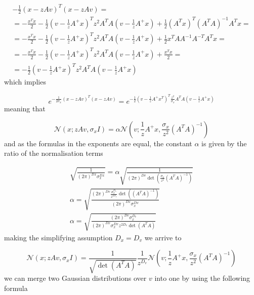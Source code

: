 \documentclass{paper}
\begin{document}
\begin{equation}
\begin{split}
-\frac{1}{2} (x-zAv)^T(x-zAv) = \\
= -\frac{x^Tx}{2} -\frac{1}{2} (v - \frac{1}{z}A^{+}x)^T z^2A^TA (v - \frac{1}{z}A^{+}x)  + \frac{1}{2} (A^Tx)^T (A^TA)^{-1}A^Tx = \\
=-\frac{x^Tx}{2} -\frac{1}{2} (v - \frac{1}{z}A^{+}x)^T z^2A^TA (v - \frac{1}{z}A^{+}x)  + \frac{1}{2} x^T A A^{-1} A^{-T} A^T x = \\
= -\frac{x^Tx}{2} -\frac{1}{2} (v - \frac{1}{z}A^{+}x)^T z^2A^TA (v - \frac{1}{z}A^{+}x)  + \frac{x^Tx}{2} = \\
= -\frac{1}{2} (v - \frac{1}{z}A^{+}x)^T z^2A^TA (v - \frac{1}{z}A^{+}x)
\end{split}
\end{equation}
%
which implies

\begin{equation}
e^{-\frac{1}{2 \sigma_x} (x-zAv)^T(x-zAv)} = e^{-\frac{1}{2} (v - \frac{1}{z}A^{+}x^T)^T \frac{z^2}{\sigma_x} A^TA(v - \frac{1}{z}A^{+}x)}
\end{equation}
% 
meaning that

\begin{equation} 
\mathcal{N}(x;zAv,\sigma_x I) = \alpha \mathcal{N}(v;\frac{1}{z}A^{+}x,\frac{\sigma_x}{z^2} (A^TA)^{-1})
\end{equation}
%
and as the formulas in the exponents are equal, the constant  $\alpha$ is given by the ratio of the normalisation terms

\begin{eqnarray}
\sqrt{\frac{1}{(2\pi)^{Dx} \sigma_x^{Dx}}} = \alpha \sqrt{\frac{1}{(2\pi)^{Dv} \det(\frac{\sigma_x}{z^2} (A^TA)^{-1})}} \\
\alpha = \sqrt{\frac{ (2\pi)^{Dv} \frac{\sigma_x^{D_v}}{z^{2D_v}} \det( (A^TA)^{-1}) }{ (2\pi)^{Dx} \sigma_x^{Dx} }} \\
\alpha = \sqrt{\frac{ (2\pi)^{Dv} \sigma_x^{D_v} }{ (2\pi)^{Dx} \sigma_x^{Dx} z^{2D_v} \det(A^TA)}}
\end{eqnarray}
%
making the simplifying assumption $D_x = D_v$ we arrive to

\begin{equation} 
\mathcal{N}(x;zAv,\sigma_x I) = \frac{1}{\sqrt{\det(A^TA)}} \frac{1}{z^{D_v}} \mathcal{N}(v;\frac{1}{z}A^{+}x,\frac{\sigma_x}{z^2} (A^TA)^{-1})
\end{equation}
%
we can merge two Gaussian distributions over $v$ into one by using the following formula
\end{document}

